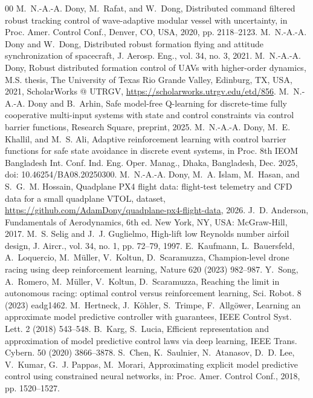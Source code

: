 \documentclass[final,5p,times,twocolumn]{elsarticle}
\begin{document}
\begin{thebibliography}{00}
 M.~N.-A.-A. Dony, M.~Rafat, and W.~Dong, Distributed command filtered robust tracking control of wave-adaptive modular vessel with uncertainty, in Proc. Amer. Control Conf., Denver, CO, USA, 2020, pp. 2118--2123.
 M.~N.-A.-A. Dony and W.~Dong, Distributed robust formation flying and attitude synchronization of spacecraft, J. Aerosp. Eng., vol. 34, no. 3, 2021.
 M.~N.-A.-A. Dony, Robust distributed formation control of UAVs with higher-order dynamics, M.S. thesis, The University of Texas Rio Grande Valley, Edinburg, TX, USA, 2021, ScholarWorks @ UTRGV, \url{https://scholarworks.utrgv.edu/etd/856}.
 M.~N.-A.-A. Dony and B.~Arhin, Safe model-free Q-learning for discrete-time fully cooperative multi-input systems with state and control constraints via control barrier functions, Research Square, preprint, 2025.
 M.~N.-A.-A. Dony, M.~E. Khallil, and M.~S. Ali, Adaptive reinforcement learning with control barrier functions for safe state avoidance in discrete event systems, in Proc. 8th IEOM Bangladesh Int. Conf. Ind. Eng. Oper. Manag., Dhaka, Bangladesh, Dec. 2025, doi: 10.46254/BA08.20250300.
 M.~N.-A.-A. Dony, M.~A. Islam, M.~Hasan, and S.~G.~M. Hossain, Quadplane PX4 flight data: flight-test telemetry and CFD data for a small quadplane VTOL, dataset, \url{https://github.com/AdamDony/quadplane-px4-flight-data}, 2026.
 J.~D. Anderson, Fundamentals of Aerodynamics, 6th ed. New York, NY, USA: McGraw-Hill, 2017.
 M.~S. Selig and J.~J. Guglielmo, High-lift low Reynolds number airfoil design, J. Aircr., vol. 34, no. 1, pp. 72--79, 1997.
 E.~Kaufmann, L.~Bauersfeld, A.~Loquercio, M.~M\"uller, V.~Koltun, D.~Scaramuzza, Champion-level drone racing using deep reinforcement learning, Nature 620 (2023) 982--987.
 Y.~Song, A.~Romero, M.~M\"uller, V.~Koltun, D.~Scaramuzza, Reaching the limit in autonomous racing: optimal control versus reinforcement learning, Sci. Robot. 8 (2023) eadg1462.
 M.~Hertneck, J.~K\"ohler, S.~Trimpe, F.~Allg\"ower, Learning an approximate model predictive controller with guarantees, IEEE Control Syst. Lett. 2 (2018) 543--548.
 B.~Karg, S.~Lucia, Efficient representation and approximation of model predictive control laws via deep learning, IEEE Trans. Cybern. 50 (2020) 3866--3878.
 S.~Chen, K.~Saulnier, N.~Atanasov, D.~D. Lee, V.~Kumar, G.~J. Pappas, M.~Morari, Approximating explicit model predictive control using constrained neural networks, in: Proc. Amer. Control Conf., 2018, pp. 1520--1527.

\end{thebibliography}
\end{document}
